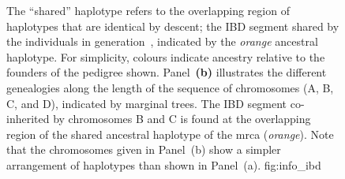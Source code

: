 \begin{figure}[p]
{The ``shared'' haplotype refers to the overlapping region of haplotypes that are identical by descent; \ie the IBD segment shared by the  individuals in generation~, indicated by the \emph{orange} ancestral haplotype.
For simplicity, colours indicate ancestry relative to the founders of the pedigree shown.
Panel~\textbf{(b)} illustrates the different genealogies along the length of the sequence of  chromosomes (A, B, C, and D), indicated by  marginal trees.
The IBD segment co-inherited by chromosomes B and C is found at the overlapping region of the shared ancestral haplotype of the \gls{mrca} (\emph{orange}).
Note that the  chromosomes given in Panel~(b) show a simpler arrangement of haplotypes than shown in Panel~(a).}
{fig:info_ibd}
\end{figure}
